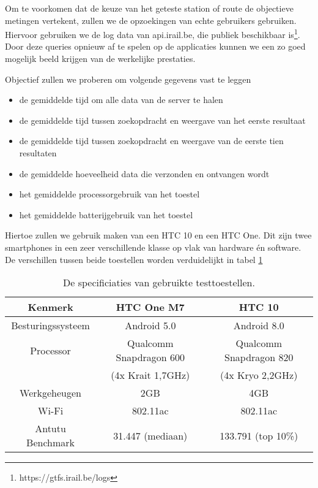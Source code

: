 Om te voorkomen dat de keuze van het geteste station of route de objectieve metingen vertekent, zullen we de opzoekingen van echte gebruikers gebruiken. Hiervoor gebruiken we de log data van api.irail.be, die publiek beschikbaar is\footnote{https://gtfs.irail.be/logs}. Door deze queries opnieuw af te spelen op de applicaties kunnen we een zo goed mogelijk beeld krijgen van de werkelijke prestaties.

Objectief zullen we proberen om volgende gegevens vast te leggen
\begin{itemize}
	\item de gemiddelde tijd om alle data van de server te halen
	\item de gemiddelde tijd tussen zoekopdracht en weergave van het eerste resultaat
	\item de gemiddelde tijd tussen zoekopdracht en weergave van de eerste tien resultaten
	\item de gemiddelde hoeveelheid data die verzonden en ontvangen wordt
	\item het gemiddelde processorgebruik van het toestel
	\item het gemiddelde batterijgebruik van het toestel
\end{itemize}

Hiertoe zullen we gebruik maken van een HTC 10 en een HTC One. Dit zijn twee smartphones in een zeer verschillende klasse op vlak van hardware én software. De verschillen tussen beide toestellen worden verduidelijkt in tabel \ref{tab:testdevices}
\begin{table}[ht]
	\begin{tabular}{| c | c | c |}
		\hline
		Kenmerk & HTC One M7 & HTC 10 \\
		\hline
		Besturingssysteem & Android 5.0 & Android 8.0 \\
		Processor & Qualcomm Snapdragon 600 & Qualcomm Snapdragon 820\\
		& (4x Krait 1,7GHz) & (4x Kryo 2,2GHz) \\
		Werkgeheugen & 2GB & 4GB \\
		Wi-Fi & 802.11ac & 802.11ac \\
		\hline
		Antutu Benchmark & 31.447 (mediaan)  & 133.791 (top 10\%) \\
		\hline
	\end{tabular}
	\caption[Specificaties van de toestellen gebruikt voor testen]{De specificiaties van gebruikte testtoestellen.}
	\label{tab:testdevices}
\end{table}

